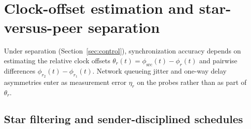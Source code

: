 \documentclass[11pt,a4paper]{article}
\theoremstyle{definition}
\begin{document}
\section{Clock-offset estimation and star-versus-peer separation}
\label{sec:estimation}

Under separation (Section~\ref{sec:control}), synchronization accuracy depends
on estimating the relative clock offsets
$\theta_r(t) = \phi_{\mathrm{src}}(t) - \phi_r(t)$ and pairwise differences
$\phi_{r_2}(t) - \phi_{r_1}(t)$. Network queueing jitter and one-way delay
asymmetries enter as measurement error $\eta_r$ on the probes rather than as
part of $\theta_r$.

\subsection{Star filtering and sender-disciplined schedules}
\end{document}

